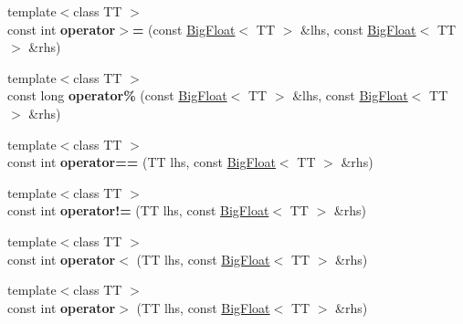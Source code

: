 \begin{DoxyCompactItemize}
\item 
\hypertarget{classatl_1_1_big_float_a71c4bd0a7a769e4c08161b6485416380}{{\footnotesize template$<$class T\+T $>$ }\\const int {\bfseries operator$>$=} (const \hyperlink{classatl_1_1_big_float}{Big\+Float}$<$ T\+T $>$ \&lhs, const \hyperlink{classatl_1_1_big_float}{Big\+Float}$<$ T\+T $>$ \&rhs)}\label{classatl_1_1_big_float_a71c4bd0a7a769e4c08161b6485416380}

\item 
\hypertarget{classatl_1_1_big_float_a0d02f934787b307fb310bcf659c532ec}{{\footnotesize template$<$class T\+T $>$ }\\const long {\bfseries operator\%} (const \hyperlink{classatl_1_1_big_float}{Big\+Float}$<$ T\+T $>$ \&lhs, const \hyperlink{classatl_1_1_big_float}{Big\+Float}$<$ T\+T $>$ \&rhs)}\label{classatl_1_1_big_float_a0d02f934787b307fb310bcf659c532ec}

\item 
\hypertarget{classatl_1_1_big_float_a4d67f17c65d80fc1729d1680a33e0c3a}{{\footnotesize template$<$class T\+T $>$ }\\const int {\bfseries operator==} (T\+T lhs, const \hyperlink{classatl_1_1_big_float}{Big\+Float}$<$ T\+T $>$ \&rhs)}\label{classatl_1_1_big_float_a4d67f17c65d80fc1729d1680a33e0c3a}

\item 
\hypertarget{classatl_1_1_big_float_a84d70acac534a4aa12ea06fce8bca0d0}{{\footnotesize template$<$class T\+T $>$ }\\const int {\bfseries operator!=} (T\+T lhs, const \hyperlink{classatl_1_1_big_float}{Big\+Float}$<$ T\+T $>$ \&rhs)}\label{classatl_1_1_big_float_a84d70acac534a4aa12ea06fce8bca0d0}

\item 
\hypertarget{classatl_1_1_big_float_afc14e7fd462b04b7491cfe7361a6c89d}{{\footnotesize template$<$class T\+T $>$ }\\const int {\bfseries operator$<$} (T\+T lhs, const \hyperlink{classatl_1_1_big_float}{Big\+Float}$<$ T\+T $>$ \&rhs)}\label{classatl_1_1_big_float_afc14e7fd462b04b7491cfe7361a6c89d}

\item 
\hypertarget{classatl_1_1_big_float_ab7f8890099f3196231825708e29fe961}{{\footnotesize template$<$class T\+T $>$ }\\const int {\bfseries operator$>$} (T\+T lhs, const \hyperlink{classatl_1_1_big_float}{Big\+Float}$<$ T\+T $>$ \&rhs)}\label{classatl_1_1_big_float_ab7f8890099f3196231825708e29fe961}


\end{DoxyCompactItemize}
